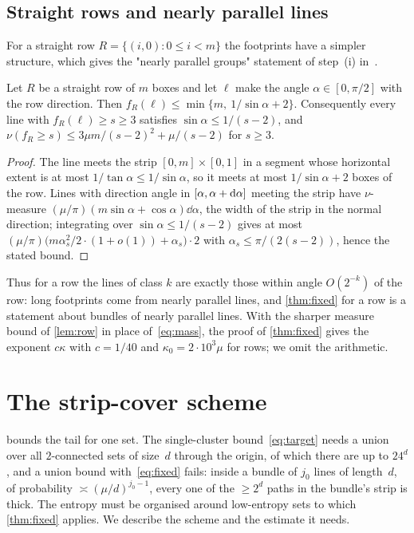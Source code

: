 \documentclass[11pt,letterpaper]{article}
\begin{document}
\subsection{Straight rows and nearly parallel lines}
\label{sec:row}

For a straight row $R=\{(i,0)\colon0\le i<m\}$ the footprints have a simpler structure, which gives the "nearly parallel groups" statement of step~(i) in~\cite[Section~5]{FM26}.

\begin{lemma}[Rows]
\label{lem:row}
Let $R$ be a straight row of $m$ boxes and let $\ell$ make the angle $\alpha\in[0,\pi/2]$ with the row direction. Then $f_R(\ell)\le\min\{m,\ 1/\sin\alpha+2\}$. Consequently every line with $f_R(\ell)\ge s\ge3$ satisfies $\sin\alpha\le1/(s-2)$, and $\nu(f_R\ge s)\le3\mu m/(s-2)^2+\mu/(s-2)$ for $s\ge3$.
\end{lemma}

\begin{proof}
The line meets the strip $[0,m]\times[0,1]$ in a segment whose horizontal extent is at most $1/\tan\alpha\le1/\sin\alpha$, so it meets at most $1/\sin\alpha+2$ boxes of the row. Lines with direction angle in $[\alpha,\alpha+\mathrm{d}\alpha]$ meeting the strip have $\nu$-measure $(\mu/\pi)(m\sin\alpha+\cos\alpha)\dd\alpha$, the width of the strip in the normal direction; integrating over $\sin\alpha\le1/(s-2)$ gives at most $(\mu/\pi)\bigl(m\alpha_s^2/2\cdot(1+o(1))+\alpha_s\bigr)\cdot2$ with $\alpha_s\le\pi/(2(s-2))$, hence the stated bound.
\end{proof}

Thus for a row the lines of class $k$ are exactly those within angle $O(2^{-k})$ of the row: long footprints come from nearly parallel lines, and \cref{thm:fixed} for a row is a statement about bundles of nearly parallel lines. With the sharper measure bound of \cref{lem:row} in place of~\eqref{eq:mass}, the proof of \cref{thm:fixed} gives the exponent $c\kappa$ with $c=1/40$ and $\kappa_0=2\cdot10^3\mu$ for rows; we omit the arithmetic.

\section{The strip-cover scheme}
\label{sec:cover}

 bounds the tail for one set. The single-cluster bound~\eqref{eq:target} needs a union over all $2$-connected sets of size~$d$ through the origin, of which there are up to $24^d$, and a union bound with~\eqref{eq:fixed} fails: inside a bundle of $j_0$ lines of length~$d$, of probability $\asymp(\mu/d)^{j_0-1}$, every one of the $\ge2^d$ paths in the bundle's strip is thick. The entropy must be organised around low-entropy sets to which \cref{thm:fixed} applies. We describe the scheme and the estimate it needs.
\end{document}
